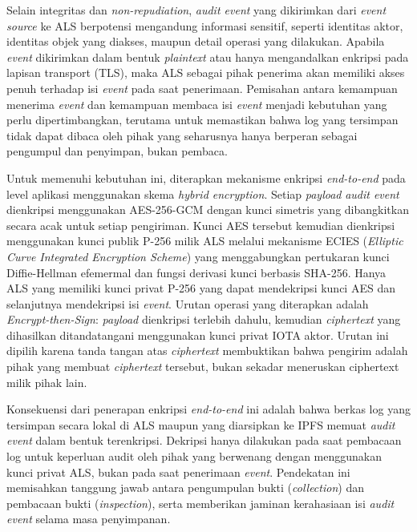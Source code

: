 Selain integritas dan \textit{non-repudiation}, \textit{audit event} yang dikirimkan dari \textit{event source} ke ALS berpotensi mengandung informasi sensitif, seperti identitas aktor, identitas objek yang diakses, maupun detail operasi yang dilakukan. Apabila \textit{event} dikirimkan dalam bentuk \textit{plaintext} atau hanya mengandalkan enkripsi pada lapisan transport (TLS), maka ALS sebagai pihak penerima akan memiliki akses penuh terhadap isi \textit{event} pada saat penerimaan. Pemisahan antara kemampuan menerima \textit{event} dan kemampuan membaca isi \textit{event} menjadi kebutuhan yang perlu dipertimbangkan, terutama untuk memastikan bahwa log yang tersimpan tidak dapat dibaca oleh pihak yang seharusnya hanya berperan sebagai pengumpul dan penyimpan, bukan pembaca.

Untuk memenuhi kebutuhan ini, diterapkan mekanisme enkripsi \textit{end-to-end} pada level aplikasi menggunakan skema \textit{hybrid encryption}. Setiap \textit{payload} \textit{audit event} dienkripsi menggunakan AES-256-GCM dengan kunci simetris yang dibangkitkan secara acak untuk setiap pengiriman. Kunci AES tersebut kemudian dienkripsi menggunakan kunci publik P-256 milik ALS melalui mekanisme ECIES (\textit{Elliptic Curve Integrated Encryption Scheme}) yang menggabungkan pertukaran kunci Diffie-Hellman efemermal dan fungsi derivasi kunci berbasis SHA-256. Hanya ALS yang memiliki kunci privat P-256 yang dapat mendekripsi kunci AES dan selanjutnya mendekripsi isi \textit{event}. Urutan operasi yang diterapkan adalah \textit{Encrypt-then-Sign}: \textit{payload} dienkripsi terlebih dahulu, kemudian \textit{ciphertext} yang dihasilkan ditandatangani menggunakan kunci privat IOTA aktor. Urutan ini dipilih karena tanda tangan atas \textit{ciphertext} membuktikan bahwa pengirim adalah pihak yang membuat \textit{ciphertext} tersebut, bukan sekadar meneruskan ciphertext milik pihak lain.

Konsekuensi dari penerapan enkripsi \textit{end-to-end} ini adalah bahwa berkas log yang tersimpan secara lokal di ALS maupun yang diarsipkan ke IPFS memuat \textit{audit event} dalam bentuk terenkripsi. Dekripsi hanya dilakukan pada saat pembacaan log untuk keperluan audit oleh pihak yang berwenang dengan menggunakan kunci privat ALS, bukan pada saat penerimaan \textit{event}. Pendekatan ini memisahkan tanggung jawab antara pengumpulan bukti (\textit{collection}) dan pembacaan bukti (\textit{inspection}), serta memberikan jaminan kerahasiaan isi \textit{audit event} selama masa penyimpanan.

